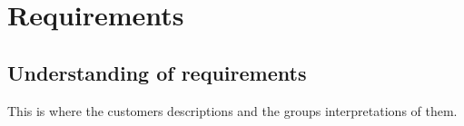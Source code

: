 \chapter{Requirements}
\section{Understanding of requirements}
This is where the customers descriptions and the groups interpretations of them.
